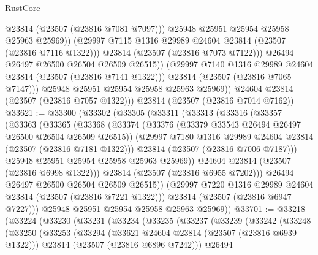 \begin{lexlean}{RustCore}
\begin{coremodule}
                        @23814
                        (@23507 (@23816 @7081 @7097)))
                      @25948
                      @25951
                      @25954
                      @25958
                      @25963
                      @25969))
                  (@29997 @7115 @1316 @29989 @24604 @23814 (@23507 (@23816 @7116 @1322)))
                  @23814
                  (@23507 (@23816 @7073 @7122)))
                @26494
                @26497
                @26500
                @26504
                @26509
                @26515))
            (@29997 @7140 @1316 @29989 @24604 @23814 (@23507 (@23816 @7141 @1322)))
            @23814
            (@23507 (@23816 @7065 @7147)))
          @25948
          @25951
          @25954
          @25958
          @25963
          @25969))
      @24604
      @23814
      (@23507 (@23816 @7057 @1322)))
    @23814
    (@23507 (@23816 @7014 @7162))
@33621 := @33300
    (@33302
      (@33305
        (@33311
          (@33313
            (@33316
              (@33357
                (@33363
                  (@33365
                    (@33368
                      (@33374
                        (@33376 (@33379 @33543 @26494 @26497 @26500 @26504 @26509 @26515))
                        (@29997 @7180 @1316 @29989 @24604 @23814 (@23507 (@23816 @7181 @1322)))
                        @23814
                        (@23507 (@23816 @7006 @7187)))
                      @25948
                      @25951
                      @25954
                      @25958
                      @25963
                      @25969))
                  @24604
                  @23814
                  (@23507 (@23816 @6998 @1322)))
                @23814
                (@23507 (@23816 @6955 @7202)))
              @26494
              @26497
              @26500
              @26504
              @26509
              @26515))
          (@29997 @7220 @1316 @29989 @24604 @23814 (@23507 (@23816 @7221 @1322)))
          @23814
          (@23507 (@23816 @6947 @7227)))
        @25948
        @25951
        @25954
        @25958
        @25963
        @25969))
@33701 := @33218
    (@33224
      (@33230
        (@33231
          (@33234
            (@33235
              (@33237
                (@33239
                  (@33242
                    (@33248
                      (@33250
                        (@33253
                          (@33294
                            (@33621 @24604 @23814 (@23507 (@23816 @6939 @1322)))
                            @23814
                            (@23507 (@23816 @6896 @7242)))
                          @26494

\end{coremodule}
\end{lexlean}
